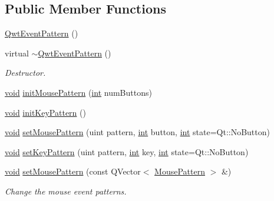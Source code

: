 \subsection*{Public Member Functions}
\begin{DoxyCompactItemize}
\item 
\hyperlink{class_qwt_event_pattern_a1236c9239a3d8281d66b255ad18f7ee2}{Qwt\-Event\-Pattern} ()
\item 
virtual \hyperlink{class_qwt_event_pattern_a3f8c2a2cca991000bafefd924b47895d}{$\sim$\-Qwt\-Event\-Pattern} ()
\begin{DoxyCompactList}\small\item\em Destructor. \end{DoxyCompactList}\item 
\hyperlink{group___u_a_v_objects_plugin_ga444cf2ff3f0ecbe028adce838d373f5c}{void} \hyperlink{class_qwt_event_pattern_ab885e0f266fd5b574ccbc6272225f486}{init\-Mouse\-Pattern} (\hyperlink{ioapi_8h_a787fa3cf048117ba7123753c1e74fcd6}{int} num\-Buttons)
\item 
\hyperlink{group___u_a_v_objects_plugin_ga444cf2ff3f0ecbe028adce838d373f5c}{void} \hyperlink{class_qwt_event_pattern_a91c1acb96b5c3849b9518206290f7da8}{init\-Key\-Pattern} ()
\item 
\hyperlink{group___u_a_v_objects_plugin_ga444cf2ff3f0ecbe028adce838d373f5c}{void} \hyperlink{class_qwt_event_pattern_ac63fb935c777421794d669aa63faec68}{set\-Mouse\-Pattern} (uint pattern, \hyperlink{ioapi_8h_a787fa3cf048117ba7123753c1e74fcd6}{int} button, \hyperlink{ioapi_8h_a787fa3cf048117ba7123753c1e74fcd6}{int} state=Qt\-::\-No\-Button)
\item 
\hyperlink{group___u_a_v_objects_plugin_ga444cf2ff3f0ecbe028adce838d373f5c}{void} \hyperlink{class_qwt_event_pattern_a2c3b52e4f470086fb6b883ff1f48b711}{set\-Key\-Pattern} (uint pattern, \hyperlink{ioapi_8h_a787fa3cf048117ba7123753c1e74fcd6}{int} key, \hyperlink{ioapi_8h_a787fa3cf048117ba7123753c1e74fcd6}{int} state=Qt\-::\-No\-Button)
\item 
\hyperlink{group___u_a_v_objects_plugin_ga444cf2ff3f0ecbe028adce838d373f5c}{void} \hyperlink{class_qwt_event_pattern_ad8e3b196c1026b038ccdf359f9a69d29}{set\-Mouse\-Pattern} (const Q\-Vector$<$ \hyperlink{class_qwt_event_pattern_1_1_mouse_pattern}{Mouse\-Pattern} $>$ \&)
\begin{DoxyCompactList}\small\item\em Change the mouse event patterns. \end{DoxyCompactList}\item 

\end{DoxyCompactItemize}
